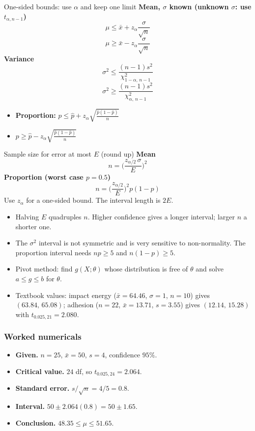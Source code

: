 \begin{formulabox}{One-sided bounds: use $\alpha$ and keep one limit}
\textbf{Mean, $\sigma$ known (unknown $\sigma$: use $t_{\alpha,n-1}$)}
\[ \mu\le\bar{x}+z_\alpha\frac{\sigma}{\sqrt n} \]
\[ \mu\ge\bar{x}-z_\alpha\frac{\sigma}{\sqrt n} \]
\textbf{Variance}
\[ \sigma^2\le\frac{(n-1)s^2}{\chi^2_{1-\alpha,\,n-1}} \]
\[ \sigma^2\ge\frac{(n-1)s^2}{\chi^2_{\alpha,\,n-1}} \]
\begin{itemize}
  \item \textbf{Proportion:} $p\le\hat{p}+z_\alpha\sqrt{\tfrac{\hat{p}(1-\hat{p})}{n}}$
  \item $p\ge\hat{p}-z_\alpha\sqrt{\tfrac{\hat{p}(1-\hat{p})}{n}}$
\end{itemize}
\end{formulabox}

\begin{formulabox}{Sample size for error at most $E$ (round up)}
\textbf{Mean}
\[ n=\Big(\frac{z_{\alpha/2}\,\sigma}{E}\Big)^2 \]
\textbf{Proportion (worst case $p=0.5$)}
\[ n=\Big(\frac{z_{\alpha/2}}{E}\Big)^2p(1-p) \]
Use $z_\alpha$ for a one-sided bound. The interval length is $2E$.
\end{formulabox}

\begin{notebox}
\begin{itemize}
  \item Halving $E$ quadruples $n$. Higher confidence gives a longer interval; larger $n$ a shorter one.
  \item The $\sigma^2$ interval is not symmetric and is very sensitive to non-normality. The proportion interval needs $np\ge5$ and $n(1-p)\ge5$.
  \item Pivot method: find $g(X;\theta)$ whose distribution is free of $\theta$ and solve $a\le g\le b$ for $\theta$.
  \item Textbook values: impact energy ($\bar{x}=64.46$, $\sigma=1$, $n=10$) gives $(63.84,\,65.08)$; adhesion ($n=22$, $\bar{x}=13.71$, $s=3.55$) gives $(12.14,\,15.28)$ with $t_{0.025,21}=2.080$.
\end{itemize}
\end{notebox}

\subsubsection*{Worked numericals}

\begin{example}
\begin{itemize}
  \item \textbf{Given.} $n=25$, $\bar{x}=50$, $s=4$, confidence $95\%$.
  \item \textbf{Critical value.} $24$ df, so $t_{0.025,24}=2.064$.
  \item \textbf{Standard error.} $s/\sqrt n=4/5=0.8$.
  \item \textbf{Interval.} $50\pm2.064(0.8)=50\pm1.65$.
  \item \textbf{Conclusion.} $48.35\le\mu\le51.65$.
\end{itemize}
\end{example}

